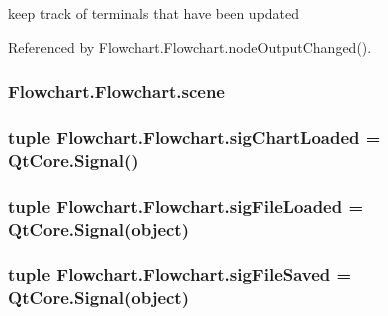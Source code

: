 keep track of terminals that have been updated 

Referenced by Flowchart.\+Flowchart.\+node\+Output\+Changed().

\hypertarget{classFlowchart_1_1Flowchart_aa6e46a6d69bd63162b96244089e2278f}{}
\subsubsection[{scene}]{\setlength{\rightskip}{0pt plus 5cm}Flowchart.\+Flowchart.\+scene}\label{classFlowchart_1_1Flowchart_aa6e46a6d69bd63162b96244089e2278f}
\hypertarget{classFlowchart_1_1Flowchart_a9c8f87ebe300f13b148f52e688ec4602}{}
\subsubsection[{sig\+Chart\+Loaded}]{\setlength{\rightskip}{0pt plus 5cm}tuple Flowchart.\+Flowchart.\+sig\+Chart\+Loaded = Qt\+Core.\+Signal()\hspace{0.3cm}{\ttfamily [static]}}\label{classFlowchart_1_1Flowchart_a9c8f87ebe300f13b148f52e688ec4602}
\hypertarget{classFlowchart_1_1Flowchart_a6012334b34647ab6f9f3b1085222e215}{}
\subsubsection[{sig\+File\+Loaded}]{\setlength{\rightskip}{0pt plus 5cm}tuple Flowchart.\+Flowchart.\+sig\+File\+Loaded = Qt\+Core.\+Signal(object)\hspace{0.3cm}{\ttfamily [static]}}\label{classFlowchart_1_1Flowchart_a6012334b34647ab6f9f3b1085222e215}
\hypertarget{classFlowchart_1_1Flowchart_af55a007430b3d3f20fafff072db2062d}{}
\subsubsection[{sig\+File\+Saved}]{\setlength{\rightskip}{0pt plus 5cm}tuple Flowchart.\+Flowchart.\+sig\+File\+Saved = Qt\+Core.\+Signal(object)\hspace{0.3cm}{\ttfamily [static]}}\label{classFlowchart_1_1Flowchart_af55a007430b3d3f20fafff072db2062d}
\hypertarget{classFlowchart_1_1Flowchart_a37468c41e4a9ea99422bbe50ea36968a}{}
